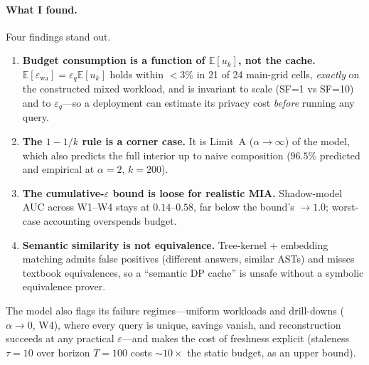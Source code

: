\documentclass[sigconf,nonacm]{acmart}
\newcommand{\eps}{\varepsilon}
\newcommand{\E}{\mathbb{E}}
\begin{document}
\paragraph{What I found.} Four findings stand out.
\begin{enumerate}
    \item \textbf{Budget consumption is a function of $\E[u_k]$, not the cache.} $\E[\eps_{\mathrm{wa}}]=\eps_q\E[u_k]$ holds within $<3\%$ in 21 of 24 main-grid cells, \emph{exactly} on the constructed mixed workload, and is invariant to scale (SF=1 vs SF=10) and to $\eps_q$---so a deployment can estimate its privacy cost \emph{before} running any query.
    \item \textbf{The $1-1/k$ rule is a corner case.} It is Limit~A ($\alpha\to\infty$) of the model, which also predicts the full interior up to naive composition ($96.5\%$ predicted and empirical at $\alpha=2$, $k=200$).
    \item \textbf{The cumulative-$\eps$ bound is loose for realistic MIA.} Shadow-model AUC across W1--W4 stays at $0.14$--$0.58$, far below the bound's $\to 1.0$; worst-case accounting overspends budget.
    \item \textbf{Semantic similarity is not equivalence.} Tree-kernel + embedding matching admits false positives (different answers, similar ASTs) and misses textbook equivalences, so a ``semantic DP cache'' is unsafe without a symbolic equivalence prover.
\end{enumerate}

\noindent The model also flags its failure regimes---uniform workloads and drill-downs ($\alpha\to0$, W4), where every query is unique, savings vanish, and reconstruction succeeds at any practical $\eps$---and makes the cost of freshness explicit (staleness $\tau{=}10$ over horizon $T{=}100$ costs ${\sim}10\times$ the static budget, as an upper bound).
\end{document}
